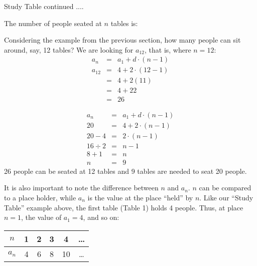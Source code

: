 \documentclass[10pt,a4paper,titlepage,twoside,openright]{report}
\begin{document}
\begin{wex}{Study Table continued ....}
{
The number of people seated at $n$ tables is:

Considering the example from the previous section, how many people can sit around, say, 12 tables? We are looking for $a_{12}$, that is, where $n = 12$:
\begin{eqnarray*}
a_n &=& a_1 + d \cdot (n - 1) \\
a_{12} &=& 4 + 2 \cdot (12 - 1) \\
&=& 4 + 2(11) \\
&=& 4 + 22 \\
&=& 26
\end{eqnarray*}

\begin{eqnarray*}
a_n &=& a_1 + d \cdot (n - 1) \\
20 &=& 4 + 2 \cdot (n - 1) \\
20 - 4 &=& 2 \cdot (n - 1) \\
16 \div 2 &=& n - 1 \\
8 + 1 &=& n \\
n &=& 9
\end{eqnarray*}
26 people can be seated at 12 tables and 9 tables are needed to seat 20 people.}\end{wex}

It is also important to note the difference between $n$ and $a_n$. $n$ can be compared to a place holder, while $a_n$ is the value at the place ``held'' by $n$. Like our ``Study Table'' example above, the first table (Table 1) holds 4 people. Thus, at place $n=1$, the value of $a_1 = 4$, and so on:

\begin{center}
\begin{tabular}{|c|c|c|c|c|c|}
\hline $n$ & 1 & 2 & 3 & 4 & \ldots \\
\hline $a_n$ & 4 & 6 & 8 & 10 & \ldots \\
\hline
\end{tabular}
\end{center}
\end{document}
